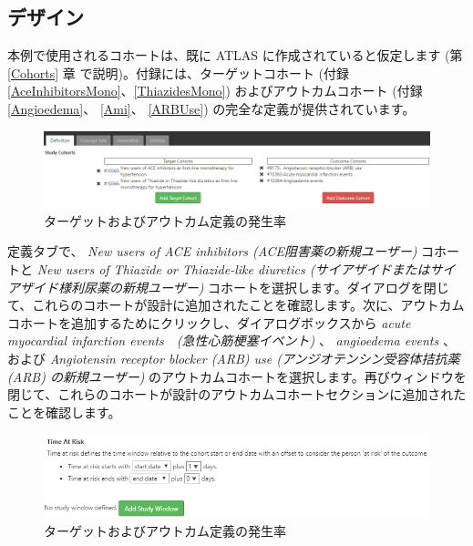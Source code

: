 \documentclass[
  11pt]{book}
\theoremstyle{definition}
\theoremstyle{definition}
\theoremstyle{definition}
\theoremstyle{definition}
\theoremstyle{remark}
\begin{document}
\subsection{デザイン}\label{ux30c7ux30b6ux30a4ux30f3-2}

本例で使用されるコホートは、既に ATLAS に作成されていると仮定します (第 \ref{Cohorts} 章 で説明)。付録には、ターゲットコホート (付録 \ref{AceInhibitorsMono}、\ref{ThiazidesMono}) およびアウトカムコホート (付録 \ref{Angioedema}、 \ref{Ami}、 \ref{ARBUse}) の完全な定義が提供されています。

\begin{figure}

{\centering \includegraphics[width=1\linewidth]{images/Characterization/atlasIncidenceCohortSelection} 

}

\caption{ターゲットおよびアウトカム定義の発生率}\label{fig:atlasIncidenceCohortSelection}
\end{figure}

定義タブで、 \emph{New users of ACE inhibitors (ACE阻害薬の新規ユーザー)} コホートと \emph{New users of Thiazide or Thiazide-like diuretics (サイアザイドまたはサイアザイド様利尿薬の新規ユーザー)} コホートを選択します。ダイアログを閉じて、これらのコホートが設計に追加されたことを確認します。次に、アウトカムコホートを追加するためにクリックし、ダイアログボックスから \emph{acute myocardial infarction events　(急性心筋梗塞イベント)} 、 \emph{angioedema events} 、および \emph{Angiotensin receptor blocker (ARB) use (アンジオテンシン受容体拮抗薬 (ARB) の新規ユーザー)} のアウトカムコホートを選択します。再びウィンドウを閉じて、これらのコホートが設計のアウトカムコホートセクションに追加されたことを確認します。

\begin{figure}

{\centering \includegraphics[width=1\linewidth]{images/Characterization/atlasIncidenceTimeAtRisk} 

}

\caption{ターゲットおよびアウトカム定義の発生率}\label{fig:atlasIncidenceTimeAtRisk}
\end{figure}
\end{document}
